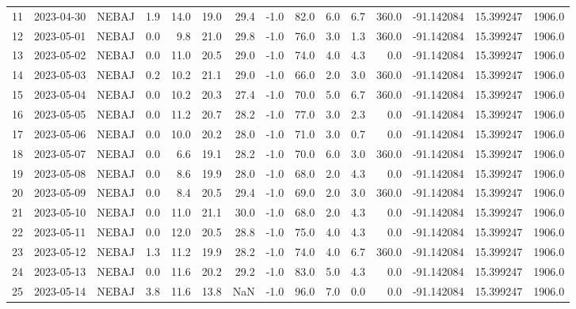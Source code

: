 \documentclass[12pt]{article}
\begin{document}
\begin{center}
\begin{tabular}{lllrrrrrrrrrrrr}
11  & 2023-04-30 &  NEBAJ &     1.9 &  14.0 &   19.0 &  29.4 &       -1.0 &     82.0 &  6.0 &         6.7 &       360.0 & -91.142084 &  15.399247 &   1906.0 \\
12  & 2023-05-01 &  NEBAJ &     0.0 &   9.8 &   21.0 &  29.8 &       -1.0 &     76.0 &  3.0 &         1.3 &       360.0 & -91.142084 &  15.399247 &   1906.0 \\
13  & 2023-05-02 &  NEBAJ &     0.0 &  11.0 &   20.5 &  29.0 &       -1.0 &     74.0 &  4.0 &         4.3 &         0.0 & -91.142084 &  15.399247 &   1906.0 \\
14  & 2023-05-03 &  NEBAJ &     0.2 &  10.2 &   21.1 &  29.0 &       -1.0 &     66.0 &  2.0 &         3.0 &       360.0 & -91.142084 &  15.399247 &   1906.0 \\
15  & 2023-05-04 &  NEBAJ &     0.0 &  10.2 &   20.3 &  27.4 &       -1.0 &     70.0 &  5.0 &         6.7 &       360.0 & -91.142084 &  15.399247 &   1906.0 \\
16  & 2023-05-05 &  NEBAJ &     0.0 &  11.2 &   20.7 &  28.2 &       -1.0 &     77.0 &  3.0 &         2.3 &         0.0 & -91.142084 &  15.399247 &   1906.0 \\
17  & 2023-05-06 &  NEBAJ &     0.0 &  10.0 &   20.2 &  28.0 &       -1.0 &     71.0 &  3.0 &         0.7 &         0.0 & -91.142084 &  15.399247 &   1906.0 \\
18  & 2023-05-07 &  NEBAJ &     0.0 &   6.6 &   19.1 &  28.2 &       -1.0 &     70.0 &  6.0 &         3.0 &       360.0 & -91.142084 &  15.399247 &   1906.0 \\
19  & 2023-05-08 &  NEBAJ &     0.0 &   8.6 &   19.9 &  28.0 &       -1.0 &     68.0 &  2.0 &         4.3 &         0.0 & -91.142084 &  15.399247 &   1906.0 \\
20  & 2023-05-09 &  NEBAJ &     0.0 &   8.4 &   20.5 &  29.4 &       -1.0 &     69.0 &  2.0 &         3.0 &       360.0 & -91.142084 &  15.399247 &   1906.0 \\
21  & 2023-05-10 &  NEBAJ &     0.0 &  11.0 &   21.1 &  30.0 &       -1.0 &     68.0 &  2.0 &         4.3 &         0.0 & -91.142084 &  15.399247 &   1906.0 \\
22  & 2023-05-11 &  NEBAJ &     0.0 &  12.0 &   20.5 &  28.8 &       -1.0 &     75.0 &  4.0 &         4.3 &         0.0 & -91.142084 &  15.399247 &   1906.0 \\
23  & 2023-05-12 &  NEBAJ &     1.3 &  11.2 &   19.9 &  28.2 &       -1.0 &     74.0 &  4.0 &         6.7 &       360.0 & -91.142084 &  15.399247 &   1906.0 \\
24  & 2023-05-13 &  NEBAJ &     0.0 &  11.6 &   20.2 &  29.2 &       -1.0 &     83.0 &  5.0 &         4.3 &         0.0 & -91.142084 &  15.399247 &   1906.0 \\
25  & 2023-05-14 &  NEBAJ &     3.8 &  11.6 &   13.8 &   NaN &       -1.0 &     96.0 &  7.0 &         0.0 &         0.0 & -91.142084 &  15.399247 &   1906.0 \\
\bottomrule
\end{tabular}

        
        \end{center}
        
\end{document}

